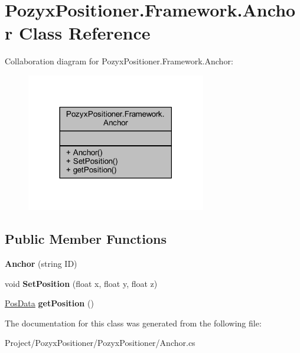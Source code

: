 \hypertarget{class_pozyx_positioner_1_1_framework_1_1_anchor}{}\section{Pozyx\+Positioner.\+Framework.\+Anchor Class Reference}
\label{class_pozyx_positioner_1_1_framework_1_1_anchor}


Collaboration diagram for Pozyx\+Positioner.\+Framework.\+Anchor\+:
\nopagebreak
\begin{figure}[H]
\begin{center}
\leavevmode
\includegraphics[width=222pt]{class_pozyx_positioner_1_1_framework_1_1_anchor__coll__graph}
\end{center}
\end{figure}
\subsection*{Public Member Functions}
\begin{DoxyCompactItemize}
\item 
\mbox{\label{class_pozyx_positioner_1_1_framework_1_1_anchor_a6d5eb54ed04aa26fb941aab5d5b6c536}} 
{\bfseries Anchor} (string ID)
\item 
\mbox{\label{class_pozyx_positioner_1_1_framework_1_1_anchor_a1f88683a8a2e2acb420a3406ad8bd4df}} 
void {\bfseries Set\+Position} (float x, float y, float z)
\item 
\mbox{\label{class_pozyx_positioner_1_1_framework_1_1_anchor_a2b304fc52f8022813374c23443864103}} 
\hyperlink{struct_pozyx_positioner_1_1_framework_1_1_pos_data}{Pos\+Data} {\bfseries get\+Position} ()
\end{DoxyCompactItemize}


The documentation for this class was generated from the following file\+:\begin{DoxyCompactItemize}
\item 
Project/\+Pozyx\+Positioner/\+Pozyx\+Positioner/Anchor.\+cs\end{DoxyCompactItemize}

